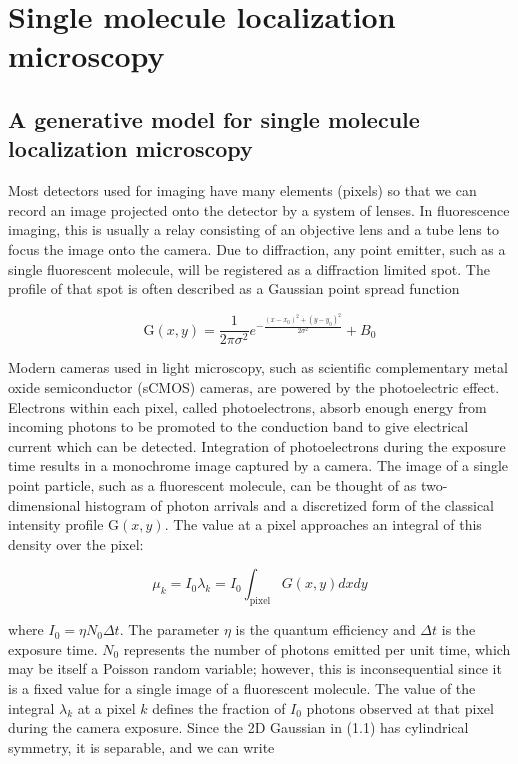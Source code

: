 \documentclass{ucetd}
\begin{document}
\clearpage

\mainmatter

\chapter{Single molecule localization microscopy}

\section{A generative model for single molecule localization microscopy}

Most detectors used for imaging have many elements (pixels) so that we can record an image projected onto the detector by a system of lenses. In fluorescence imaging, this is usually a relay consisting of an objective lens and a tube lens to focus the image onto the camera. Due to diffraction, any point emitter, such as a single fluorescent molecule, will be registered as a diffraction limited spot. The profile of that spot is often described as a Gaussian point spread function

\begin{equation}
\mathrm{G}(x,y) = \frac{1}{2\pi\sigma^{2}}e^{-\frac{(x-x_{0})^{2}+(y-y_{0})^{2}}{2\sigma^{2}}} + B_0
\end{equation}


Modern cameras used in light microscopy, such as scientific complementary metal oxide semiconductor (sCMOS) cameras, are powered by the photoelectric effect. Electrons within each pixel, called photoelectrons, absorb enough energy from incoming photons to be promoted to the conduction band to give electrical current which can be detected. Integration of photoelectrons during the exposure time results in a monochrome image captured by a camera. The image of a single point particle, such as a fluorescent molecule, can be thought of as two-dimensional histogram of photon arrivals and a discretized form of the classical intensity profile $\mathrm{G}(x,y)$. The value at a pixel approaches an integral of this density over the pixel:

\begin{equation}
\mu_{k} = I_{0}\lambda_{k} = I_{0}\int_{\mathrm{pixel}} G(x,y)dxdy
\end{equation}

where $I_{0} = \eta N_{0}\Delta t$. The parameter $\eta$ is the quantum efficiency and $\Delta t$ is the exposure time. $N_{0}$ represents the number of photons emitted per unit time, which may be itself a Poisson random variable; however, this is inconsequential since it is a fixed value for a single image of a fluorescent molecule. The value of the integral $\lambda_{k}$ at a pixel $k$ defines the fraction of $I_{0}$ photons observed at that pixel during the camera exposure. Since the 2D Gaussian in (1.1) has cylindrical symmetry, it is separable, and we can write
\end{document}
